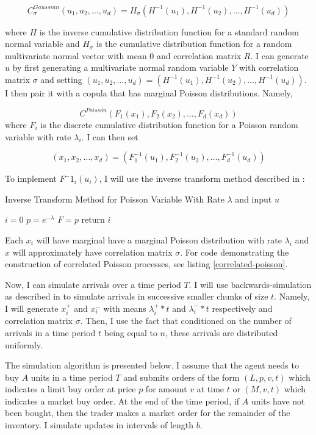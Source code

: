$$ C_\sigma^{Gaussian}(u_1, u_2, \ldots, u_d) = H_\sigma(H^{-1}(u_1), H^{-1}(u_2), \ldots,  H^{-1}(u_d))$$

where $H$ is the inverse cumulative distribution function for a standard random normal variable and $H_\sigma$ is the cumulative distribution function for a random multivariate normal vector with mean $0$ and correlation matrix $R$. I can generate $u$ by first generating a multivariate normal random variable $Y$ with correlation matrix $\sigma$ and setting $(u_1, u_2, \ldots, u_d) = (H^{-1}(u_1), H^{-1}(u_2), \ldots,  H^{-1}(u_d))$. I then pair it with a copula that has marginal Poisson distributions. Namely,

$$ C^{Poisson}(F_1(x_1), F_2(x_2), \ldots, F_d(x_d))$$ where $F_i$ is the discrete cumulative distribution function for a Poisson random variable with rate $\lambda_i$. I can then set

$$(x_1, x_2, \ldots, x_d) = (F^{-1}_1(u_1), F^{-1}_2(u_2), \ldots, F^{-1}_d(u_d))$$

To implement $F^-1_i(u_i)$, I will use the inverse transform method described in \cite{B1}:
\newline

\begin{algorithm}[H]
\SetAlgoLined
\caption{Inverse Transform Method for Poisson Variable With Rate $\lambda$ and input $u$}
 $i = 0$\;
 $p = e^{-\lambda}$\;
 $F = p$\;
 return $i$ \;
\end{algorithm}

Each $x_i$ will have marginal have a marginal Poisson distribution with rate $\lambda_i$ and $x$ will approximately have correlation matrix $\sigma$. For code demonstrating the construction of correlated Poisson processes, see listing \ref{correlated-poisson}.

Now, I can simulate arrivals over a time period $T$. I will use backwards-simulation as described in \cite{A7} to simulate arrivals in successive smaller chunks of size $t$. Namely, I will generate $x^+_i$ and $x^-_i$ with means $\lambda^+_i*t$ and $\lambda^-_i*t$ respectively and correlation matrix $\sigma$. Then, I use the fact that conditioned on the number of arrivals in a time period $t$ being equal to $n$, these arrivals are distributed uniformly. 

The simulation algorithm is presented below. I assume that the agent needs to buy $A$ units in a time period $T$ and submits orders of the form $(L,p,v,t)$ which indicates a limit buy order at price $p$ for amount $v$ at time $t$ or $(M,v,t)$ which indicates a market buy order. At the end of the time period, if $A$ units have not been bought, then the trader makes a market order for the remainder of the inventory. I simulate updates in intervals of length $b$.

